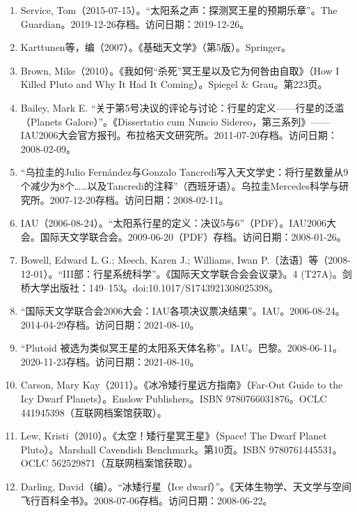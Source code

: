 \begin{enumerate}
\item Service, Tom（2015-07-15）。“太阳系之声：探测冥王星的预期乐章”。The Guardian。2019-12-26存档。访问日期：2019-12-26。
\item Karttunen等，编（2007）。《基础天文学》（第5版）。Springer。
\item Brown, Mike（2010）。《我如何“杀死”冥王星以及它为何咎由自取》（How I Killed Pluto and Why It Had It Coming）。Spiegel \& Grau。第223页。
\item Bailey, Mark E. “关于第5号决议的评论与讨论：行星的定义——行星的泛滥（Planets Galore）”。《Dissertatio cum Nuncio Sidereo，第三系列》——IAU2006大会官方报刊。布拉格天文研究所。2011-07-20存档。访问日期：2008-02-09。
\item “乌拉圭的Julio Fernández与Gonzalo Tancredi写入天文学史：将行星数量从9个减少为8个……以及Tancredi的注释”（西班牙语）。乌拉圭Mercedes科学与研究所。2007-12-20存档。访问日期：2008-02-11。
\item IAU（2006-08-24）。“太阳系行星的定义：决议5与6”（PDF）。IAU2006大会。国际天文学联合会。2009-06-20（PDF）存档。访问日期：2008-01-26。
\item Bowell, Edward L.\,G.; Meech, Karen J.; Williams, Iwan P.〔法语〕等（2008-12-01）。“III部：行星系统科学”。《国际天文学联合会会议录》。4 (T27A)。剑桥大学出版社：149–153。doi:10.1017/S1743921308025398。
\item “国际天文学联合会2006大会：IAU各项决议票决结果”。IAU。2006-08-24。2014-04-29存档。访问日期：2021-08-10。
\item “Plutoid 被选为类似冥王星的太阳系天体名称”。IAU。巴黎。2008-06-11。2020-11-23存档。访问日期：2021-08-10。
\item Carson, Mary Kay（2011）。《冰冷矮行星远方指南》（Far-Out Guide to the Icy Dwarf Planets）。Enslow Publishers。ISBN 9780766031876。OCLC 441945398（互联网档案馆获取）。
\item Lew, Kristi（2010）。《太空！矮行星冥王星》（Space! The Dwarf Planet Pluto）。Marshall Cavendish Benchmark。第10页。ISBN 9780761445531。OCLC 562529871（互联网档案馆获取）。
\item Darling, David（编）。“冰矮行星（Ice dwarf）”。《天体生物学、天文学与空间飞行百科全书》。2008-07-06存档。访问日期：2008-06-22。
\end{enumerate}


